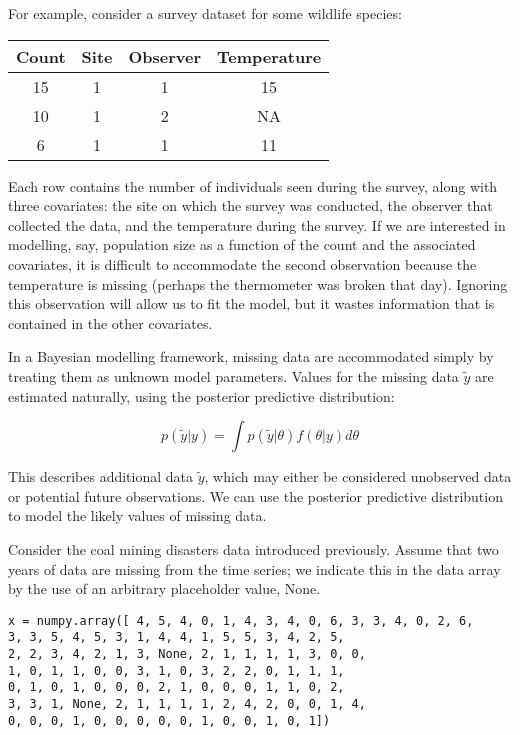 For example, consider a survey dataset for some wildlife species:

\begin{center}
\begin{tabular}{cccc}
\hline
Count & Site & Observer & Temperature\\
\hline
15 & 1 & 1 & 15\\
10 & 1 & 2 & NA\\
6 & 1 & 1 & 11\\
\hline
\end{tabular}
\end{center}

Each row contains the number of individuals seen during the survey, along with three covariates: the site on which the survey was conducted, the observer that collected the data, and the temperature during the survey. If we are interested in modelling, say, population size as a function of the count and the associated covariates, it is difficult to accommodate the second observation because the temperature is missing (perhaps the thermometer was broken that day). Ignoring this observation will allow us to fit the model, but it wastes information that is contained in the other covariates.

In a Bayesian modelling framework, missing data are accommodated simply by treating them as unknown model parameters. Values for the missing data $\tilde{y}$ are estimated naturally, using the posterior predictive distribution:

\begin{equation}
	p(\tilde{y}|y) = \int p(\tilde{y}|\theta) f(\theta|y) d\theta
\end{equation}

This describes additional data $\tilde{y}$, which may either be considered unobserved data or potential future observations. We can use the posterior predictive distribution to model the likely values of missing data.

Consider the coal mining disasters data introduced previously. Assume that two years of data are missing from the time series; we indicate this in the data array by the use of an arbitrary placeholder value, None.

\begin{verbatim}
x = numpy.array([ 4, 5, 4, 0, 1, 4, 3, 4, 0, 6, 3, 3, 4, 0, 2, 6,
3, 3, 5, 4, 5, 3, 1, 4, 4, 1, 5, 5, 3, 4, 2, 5,
2, 2, 3, 4, 2, 1, 3, None, 2, 1, 1, 1, 1, 3, 0, 0,
1, 0, 1, 1, 0, 0, 3, 1, 0, 3, 2, 2, 0, 1, 1, 1,
0, 1, 0, 1, 0, 0, 0, 2, 1, 0, 0, 0, 1, 1, 0, 2,
3, 3, 1, None, 2, 1, 1, 1, 1, 2, 4, 2, 0, 0, 1, 4,
0, 0, 0, 1, 0, 0, 0, 0, 0, 1, 0, 0, 1, 0, 1])
\end{verbatim}

